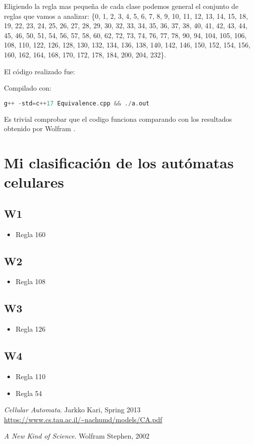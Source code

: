 \documentclass[12pt, fleqn]{report}                             %
\theoremstyle{break}                                            %
\begin{document}
      Eligiendo la regla mas pequeña de cada clase podemos general el conjunto de reglas que vamos a
      analizar: \{0, 1, 2, 3, 4, 5, 6, 7, 8, 9, 10, 11, 12, 13, 14, 15, 18, 19, 22, 23, 24, 25, 26, 27, 28, 29, 
      30, 32, 33, 34, 35, 36, 37, 38, 40, 41, 42, 43, 44, 45, 46, 50, 51, 54, 56, 57, 58, 60, 62, 72, 73, 
      74, 76, 77, 78, 90, 94, 104, 105, 106, 108, 110, 122, 126, 128, 130, 132, 134, 136, 138, 140, 142, 
      146, 150, 152, 154, 156, 160, 162, 164, 168, 170, 172, 178, 184, 200, 204, 232\}.

      El código realizado fue:
      

      Compilado con:
      \begin{lstlisting}[language=C++, gobble=6]
        g++ -std=c++17 Equivalence.cpp && ./a.out
      \end{lstlisting}

      Es trivial comprobar que el codigo funciona comparando con los resultados
      obtenido por Wolfram \cite{Wolfram}.

  \chapter{Mi clasificación de los autómatas celulares}
      \section{W1}
        \begin{itemize}
          \item Regla 160
        \end{itemize}

      \section{W2}
        \begin{itemize}
          \item Regla 108
        \end{itemize}

      \section{W3}
        \begin{itemize}
          \item Regla 126
        \end{itemize}

      \section{W4}
        \begin{itemize}
          \item Regla 110
          \item Regla 54
        \end{itemize}

\begin{thebibliography}{10}

      \textit{Cellular Automata}. 
      Jarkko Kari, Spring 2013 \\
      \url{https://www.cs.tau.ac.il/~nachumd/models/CA.pdf}

      \textit{A New Kind of Science}. 
      Wolfram Stephen, 2002 \\

\end{thebibliography}
\end{document}
